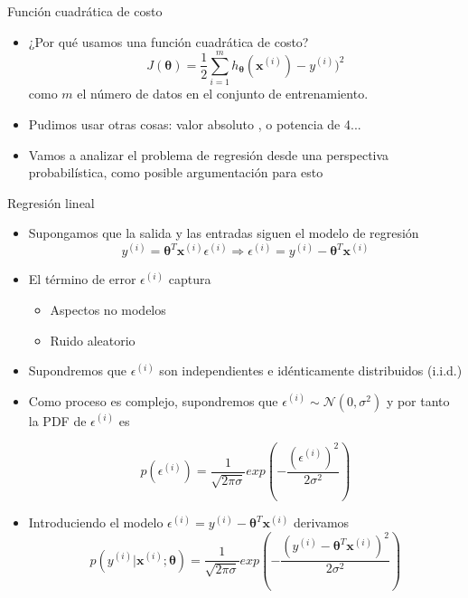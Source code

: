 \documentclass[10pt]{beamer}
\begin{document}
\begin{frame}[fragile]{Función cuadrática de costo}
\begin{itemize}
\item ¿Por qué usamos una función cuadrática de costo?
\begin{equation*}
J(\boldsymbol{\theta})= \frac{1}{2} \sum_{i=1}^{m} {h_{\boldsymbol{\theta}}(\boldsymbol{x}^{(i)})- y^{(i)})^2}
\end{equation*}
como $m$ el número de datos en el conjunto de entrenamiento.
\item Pudimos usar otras cosas: valor absoluto , o potencia de 4...
\item Vamos a analizar el problema de regresión desde una perspectiva probabilística, como posible argumentación para esto 
\end{itemize}
 
\end{frame}

\begin{frame}[fragile]{Regresión lineal}

\begin{itemize}
\item Supongamos que la salida y las entradas siguen el modelo de regresión 
\begin{equation*}
y^{(i)}= {\boldsymbol{\theta} ^T}\boldsymbol{x}^{(i)} \epsilon^{(i)} \Rightarrow   \epsilon^{(i)}= y^{(i)}-{\boldsymbol{\theta} ^T}\boldsymbol{x}^{(i)} 
\end{equation*}
\item El término de error $\epsilon^{(i)}$ captura
\begin{itemize}
\item Aspectos no modelos 
\item Ruido aleatorio
\end{itemize}

\item Supondremos que $\epsilon^{(i)}$ son independientes e idénticamente distribuidos (i.i.d.)

\item Como proceso es complejo, supondremos que $\epsilon^{(i)}\sim \mathcal{N}(0,\sigma^2)$ y por tanto la PDF de $\epsilon^{(i)}$ es 

\begin{equation*}
p(\epsilon^{(i)})= \frac{1}{\sqrt{2\pi \sigma}} exp \left( -\frac{(\epsilon^{(i)})^2}{2\sigma^2} \right) 
\end{equation*}
\item Introduciendo el modelo $\epsilon^{(i)} = y^{(i)}-{\boldsymbol{\theta} ^T}\boldsymbol{x}^{(i)} $ derivamos 
\begin{equation*}
p(y^{(i)}\vert\boldsymbol{x}^{(i)}; \boldsymbol{\theta} )=   \frac{1}{\sqrt{2\pi \sigma}} exp \left( -\frac{(y^{(i)}-{\boldsymbol{\theta} ^T}\boldsymbol{x}^{(i)})^2}{2\sigma^2} \right) 
\end{equation*}
\end{itemize}

\end{frame}
\end{document}

